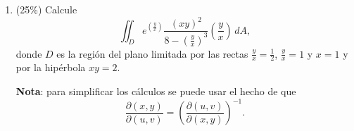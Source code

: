 \documentclass[11pt]{article}
\begin{document}
\begin{enumerate}
\noindent \textbf{Nota}: no es necesario que calcule la integral, sólo déjela planteada.

\vspace{4pt}
\noindent b) \textbf{Escriba} la masa de $\Omega$ como una integral \textbf{triple} en las coordenadas \textbf{esféricas} $(\rho,\theta,\phi)$ especificando los extremos de integración para cada variable. Justifique claramente los extremos de integración correspondientes a la variable esférica $\phi$.

\noindent \textbf{Nota}: no es necesario que calcule la integral, sólo déjela planteada.

\vspace{6cm}

\item{} (25\%) Calcule
\[
\iint_D e^{\left(\frac{y}{x}\right)} \frac{(xy)^2}{8-\left(\frac{y}{x}\right)^3}\left(\frac{y}{x}\right)\,dA,
\]
\noindent donde $D$ es la región del plano limitada por las rectas $\frac{y}{x}=\frac{1}{2}$, $\frac{y}{x}=1$ y $x=1$ y por la hipérbola $xy=2$.

\noindent \textbf{Nota}: para simplificar los cálculos se puede usar el hecho de que
\[
\frac{\partial(x,y)}{\partial(u,v)} = \left(\frac{\partial(u,v)}{\partial(x,y)}\right)^{-1}.
\]

\vspace{6cm}
\end{enumerate}

\examfooter
\end{document}
